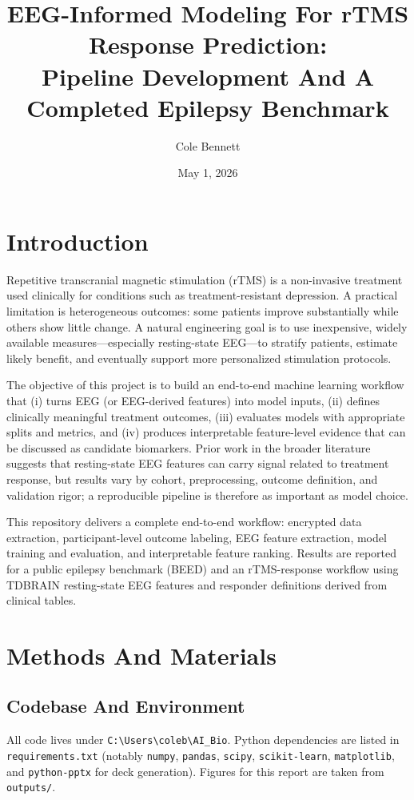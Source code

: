 \documentclass[11pt]{article}
\title{EEG-Informed Modeling For rTMS Response Prediction:\\Pipeline Development And A Completed Epilepsy Benchmark}
\author{Cole Bennett}
\date{May 1, 2026}
\begin{document}
\maketitle

\section{Introduction}
Repetitive transcranial magnetic stimulation (rTMS) is a non-invasive treatment used clinically for conditions such as treatment-resistant depression. A practical limitation is heterogeneous outcomes: some patients improve substantially while others show little change. A natural engineering goal is to use inexpensive, widely available measures---especially resting-state EEG---to stratify patients, estimate likely benefit, and eventually support more personalized stimulation protocols.

The objective of this project is to build an end-to-end machine learning workflow that (i) turns EEG (or EEG-derived features) into model inputs, (ii) defines clinically meaningful treatment outcomes, (iii) evaluates models with appropriate splits and metrics, and (iv) produces interpretable feature-level evidence that can be discussed as candidate biomarkers. Prior work in the broader literature suggests that resting-state EEG features can carry signal related to treatment response, but results vary by cohort, preprocessing, outcome definition, and validation rigor; a reproducible pipeline is therefore as important as model choice.

This repository delivers a complete end-to-end workflow: encrypted data extraction, participant-level outcome labeling, EEG feature extraction, model training and evaluation, and interpretable feature ranking. Results are reported for a public epilepsy benchmark (BEED) and an rTMS-response workflow using TDBRAIN resting-state EEG features and responder definitions derived from clinical tables.

\section{Methods And Materials}
\subsection{Codebase And Environment}
All code lives under \texttt{C:\textbackslash Users\textbackslash coleb\textbackslash AI\_Bio}. Python dependencies are listed in \texttt{requirements.txt} (notably \texttt{numpy}, \texttt{pandas}, \texttt{scipy}, \texttt{scikit-learn}, \texttt{matplotlib}, and \texttt{python-pptx} for deck generation). Figures for this report are taken from \texttt{outputs/}.
\end{document}
